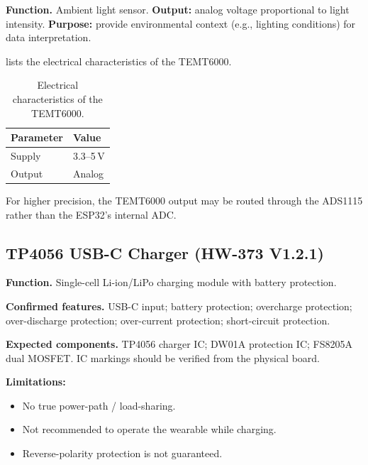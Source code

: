 \textbf{Function.} Ambient light sensor. \textbf{Output:} analog voltage proportional to light intensity. \textbf{Purpose:} provide environmental context (e.g., lighting conditions) for data interpretation.

 lists the electrical characteristics of the TEMT6000.

\begin{table}[H]
\centering
\caption{Electrical characteristics of the TEMT6000.}
\label{tab:temt6000-elec}
\small
\begin{tabularx}{\columnwidth}{@{}l Y@{}}
\toprule
\textbf{Parameter} & \textbf{Value} \\
\midrule
Supply & 3.3--5\,V \\
Output & Analog \\
\bottomrule
\end{tabularx}
\end{table}

\begin{designnote}
For higher precision, the TEMT6000 output may be routed through the ADS1115 rather than the ESP32's internal ADC.
\end{designnote}

\subsection{TP4056 USB-C Charger (HW-373 V1.2.1)}
\label{sec:tp4056}

\textbf{Function.} Single-cell Li-ion/LiPo charging module with battery protection.

\textbf{Confirmed features.} USB-C input; battery protection; overcharge protection; over-discharge protection; over-current protection; short-circuit protection.

\textbf{Expected components.} TP4056 charger IC; DW01A protection IC; FS8205A dual MOSFET. IC markings should be verified from the physical board.

\begin{warningbox}
\textbf{Limitations:}
\begin{itemize}
    \item No true power-path / load-sharing.
    \item Not recommended to operate the wearable while charging.
    \item Reverse-polarity protection is not guaranteed.
\end{itemize}
\end{warningbox}

